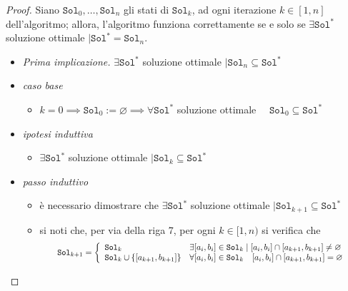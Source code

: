 \documentclass[14pt]{extreport}
\theoremstyle{definition}
\theoremstyle{definition}
\begin{document}
\begin{proof}
    Siano $\texttt{Sol}_0, \ldots, \texttt{Sol}_n$ gli stati di $\texttt{Sol}_k$, ad ogni iterazione $k \in [1, n]$ dell'algoritmo; allora, l'algoritmo funziona correttamente se e solo se $\exists \texttt{Sol}^*$ soluzione ottimale $\mid \texttt{Sol}^* = \texttt{Sol}_n$.
    \begin{itemize}
        \item[] \textit{Prima implicazione.} $\exists \texttt{Sol}^*$ soluzione ottimale $\mid \texttt{Sol}_n \subseteq \texttt{Sol}^*$
        \item \textit{caso base}
            \begin{itemize}
                \item $k = 0 \implies \texttt{Sol}_0 := \varnothing \implies \forall \texttt{Sol}^*$ soluzione ottimale $\quad \texttt{Sol}_0 \subseteq \texttt{Sol}^*$
            \end{itemize}
        \item \textit{ipotesi induttiva}
            \begin{itemize}
                \item $\exists \texttt{Sol}^*$ soluzione ottimale $\mid \texttt{Sol}_k \subseteq \texttt{Sol}^*$
            \end{itemize}
        \item \textit{passo induttivo}
            \begin{itemize}
                \item è necessario dimostrare che $\exists \texttt{Sol}^*$ soluzione ottimale $\mid \texttt{Sol}_{k + 1} \subseteq \texttt{Sol}^*$
                \item si noti che, per via della riga 7, per ogni $k \in [1, n)$ si verifica che
                \begin{equation*}
                    \resizebox{.86\hsize}{!}{
                        $\texttt{Sol}_{k + 1} = \left \{ \begin{array}{ll} \texttt{Sol}_k & \exists [a_i, b_i] \in \texttt{Sol}_k \mid [a_i, b_i] \cap [a_{k + 1}, b_{k + 1}] \neq \varnothing \\ \texttt{Sol}_k \cup \{[a_{k + 1}, b_{k + 1}]\} & \forall [a_i, b_i] \in \texttt{Sol}_k \quad [a_i, b_i] \cap [a_{k + 1}, b_{k + 1}] = \varnothing \end{array} \right.$
                    }
                \end{equation*}
                

\end{itemize}
\end{itemize}
\end{proof}
\end{document}
